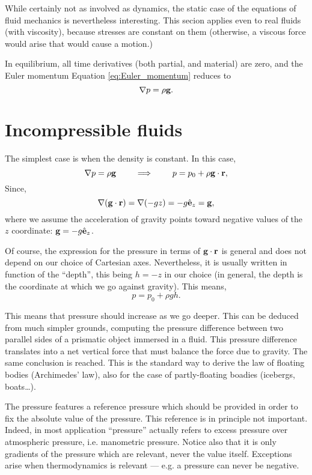 While certainly not as involved as dynamics, the static case of the
equations of fluid mechanics is nevertheless interesting. This secion
applies even to real fluids (with viscosity), because stresses are
constant on them (otherwise, a viscous force would arise that would
cause a motion.)

In equilibrium, all time derivatives (both partial, and material)
are zero, and the Euler momentum Equation \ref{eq:Euler_momentum}
reduces to
\begin{equation}
  \label{eq:hidrostatics}
  \nabla p = \rho \mathbf{g} .
\end{equation}


\section{Incompressible fluids}

The simplest case is when the density is constant. In this case,
\[
\nabla p = \rho \mathbf{g} \qquad\implies\qquad
p= p_0 + \rho \mathbf{g} \cdot \mathbf{r} ,
\]
Since,
\[
\nabla (\mathbf{g} \cdot \mathbf{r}) =
\nabla ( - g z ) = -g \hat{\mathbf{e}}_z = \mathbf{g} ,
\]
where we assume the acceleration of gravity points toward negative
values of the $z$ coordinate: $\mathbf{g} = -g \hat{\mathbf{e}}_z$.

Of course, the expression for the pressure in terms of $\mathbf{g} \cdot
\mathbf{r} $ is general and does not depend on our choice of Cartesian
axes. Nevertheless, it is usually written in function of the
``depth'', this being $h=-z$ in our choice (in general, the depth is
the coordinate at which we go against gravity). This means,
\[
p= p_0 + \rho g h.
\]

This means that pressure should increase as we go deeper. This can be
deduced from much simpler grounds, computing the pressure difference
between two parallel sides of a prismatic object immersed in a
fluid. This pressure difference translates into a net vertical force
that must balance the force due to gravity. The same conclusion is
reached. This is the standard way to derive the law of floating bodies
(Archimedes' law), also for the case of partly-floating boadies
(icebergs, boats\ldots).

The pressure features a reference pressure which should be provided in
order to fix the absolute value of the pressure. This reference is in
principle not important. Indeed, in most application ``pressure''
actually refers to excess pressure over atmospheric pressure, i.e.
manometric pressure.  Notice also that it
is only gradients of the pressure which are relevant, never the value
itself. Exceptions arise when thermodynamics is relevant --- e.g. a
pressure can never be negative.

